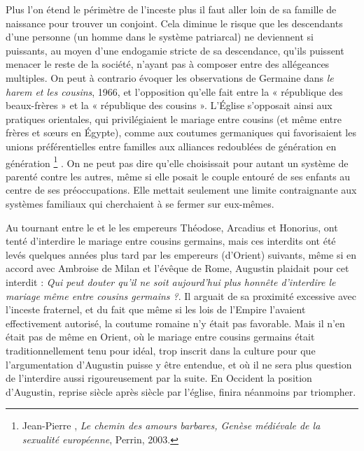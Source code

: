  Plus l'on étend le périmètre de l'inceste plus il faut aller loin de sa famille de naissance pour trouver un conjoint. Cela diminue le risque que les descendants d'une personne (un homme dans le système patriarcal) ne deviennent si puissants, au moyen d'une endogamie stricte de sa descendance, qu'ils puissent menacer le reste de la société, n'ayant pas à composer entre des allégeances multiples. On peut à contrario évoquer les observations de Germaine  dans \emph{le harem et les cousins}, 1966, et l'opposition qu'elle fait entre la « république des beaux-frères » et la « république des cousins ». L'Église s'opposait ainsi aux pratiques orientales, qui privilégiaient le mariage entre cousins (et même entre frères et sœurs en Égypte), comme aux coutumes germaniques qui favorisaient les unions préférentielles entre familles aux alliances redoublées de génération en génération%
\footnote{Jean-Pierre , \emph{Le chemin des amours barbares, Genèse médiévale de la sexualité européenne}, Perrin, 2003.}%
. On ne peut pas dire qu'elle choisissait pour autant un système de parenté contre les autres, même si elle posait le couple entouré de ses enfants au centre de ses préoccupations. Elle mettait seulement une limite contraignante aux systèmes familiaux qui cherchaient à se fermer sur eux-mêmes.

 Au tournant entre le  et le  les empereurs Théodose, Arcadius et Honorius, ont tenté d'interdire le mariage entre cousins germains, mais ces interdits ont été levés quelques années plus tard par les empereurs (d'Orient) suivants, même si en accord avec Ambroise de Milan et l'évêque de Rome, Augustin plaidait pour cet interdit : \emph{Qui peut douter qu'il ne soit aujourd'hui plus honnête d'interdire le mariage même entre cousins germains ?}. Il arguait de sa proximité excessive avec l'inceste fraternel, et du fait que même si les lois de l'Empire l'avaient effectivement autorisé, la coutume romaine n'y était pas favorable. Mais il n'en était pas de même en Orient, où le mariage entre cousins germains était traditionnellement tenu pour idéal, trop inscrit dans la culture pour que l'argumentation d'Augustin puisse y être entendue, et où il ne sera plus question de l'interdire aussi rigoureusement par la suite. En Occident la position d'Augustin, reprise siècle après siècle par l'église, finira néanmoins par triompher.

